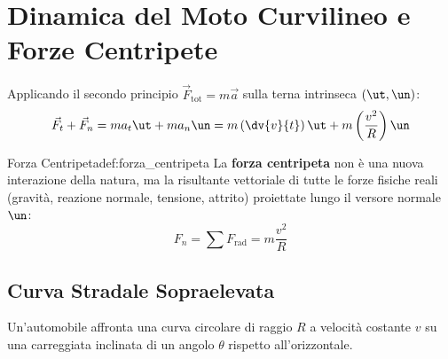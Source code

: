 \section{Dinamica del Moto Curvilineo e Forze Centripete}
\label{sec:dinamica_curvilinea}

Applicando il secondo principio $\vec{F}_{\text{tot}} = m\vec{a}$ sulla terna intrinseca $(\ut, \un)$:
\begin{equation}
    \vec{F}_t + \vec{F}_n = m a_t \ut + m a_n \un = m\left(\dv{v}{t}\right)\ut + m\left(\frac{v^2}{R}\right)\un
\end{equation}

\begin{definizione}{Forza Centripeta}{def:forza_centripeta}
La \textbf{forza centripeta} non è una nuova interazione della natura, ma la risultante vettoriale di tutte le forze fisiche reali (gravità, reazione normale, tensione, attrito) proiettate lungo il versore normale $\un$:
\begin{equation}
    F_n = \sum F_{\text{rad}} = m\frac{v^2}{R}
    \label{eq:forza_centripeta}
\end{equation}
\end{definizione}

\subsection{Curva Stradale Sopraelevata}
Un'automobile affronta una curva circolare di raggio $R$ a velocità costante $v$ su una carreggiata inclinata di un angolo $\theta$ rispetto all'orizzontale.

\begin{center}
\end{center}

